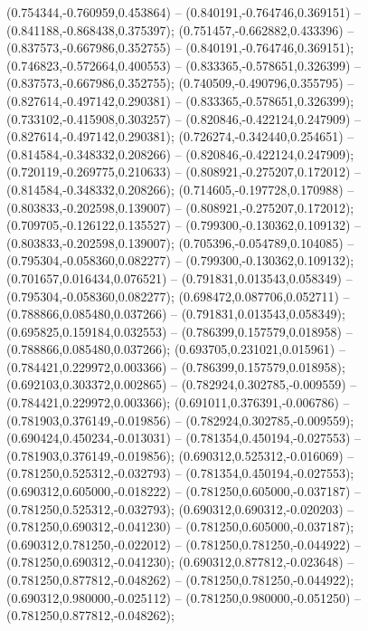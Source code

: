  (0.754344,-0.760959,0.453864) -- (0.840191,-0.764746,0.369151) -- (0.841188,-0.868438,0.375397);
 (0.751457,-0.662882,0.433396) -- (0.837573,-0.667986,0.352755) -- (0.840191,-0.764746,0.369151);
 (0.746823,-0.572664,0.400553) -- (0.833365,-0.578651,0.326399) -- (0.837573,-0.667986,0.352755);
 (0.740509,-0.490796,0.355795) -- (0.827614,-0.497142,0.290381) -- (0.833365,-0.578651,0.326399);
 (0.733102,-0.415908,0.303257) -- (0.820846,-0.422124,0.247909) -- (0.827614,-0.497142,0.290381);
 (0.726274,-0.342440,0.254651) -- (0.814584,-0.348332,0.208266) -- (0.820846,-0.422124,0.247909);
 (0.720119,-0.269775,0.210633) -- (0.808921,-0.275207,0.172012) -- (0.814584,-0.348332,0.208266);
 (0.714605,-0.197728,0.170988) -- (0.803833,-0.202598,0.139007) -- (0.808921,-0.275207,0.172012);
 (0.709705,-0.126122,0.135527) -- (0.799300,-0.130362,0.109132) -- (0.803833,-0.202598,0.139007);
 (0.705396,-0.054789,0.104085) -- (0.795304,-0.058360,0.082277) -- (0.799300,-0.130362,0.109132);
 (0.701657,0.016434,0.076521) -- (0.791831,0.013543,0.058349) -- (0.795304,-0.058360,0.082277);
 (0.698472,0.087706,0.052711) -- (0.788866,0.085480,0.037266) -- (0.791831,0.013543,0.058349);
 (0.695825,0.159184,0.032553) -- (0.786399,0.157579,0.018958) -- (0.788866,0.085480,0.037266);
 (0.693705,0.231021,0.015961) -- (0.784421,0.229972,0.003366) -- (0.786399,0.157579,0.018958);
 (0.692103,0.303372,0.002865) -- (0.782924,0.302785,-0.009559) -- (0.784421,0.229972,0.003366);
 (0.691011,0.376391,-0.006786) -- (0.781903,0.376149,-0.019856) -- (0.782924,0.302785,-0.009559);
 (0.690424,0.450234,-0.013031) -- (0.781354,0.450194,-0.027553) -- (0.781903,0.376149,-0.019856);
 (0.690312,0.525312,-0.016069) -- (0.781250,0.525312,-0.032793) -- (0.781354,0.450194,-0.027553);
 (0.690312,0.605000,-0.018222) -- (0.781250,0.605000,-0.037187) -- (0.781250,0.525312,-0.032793);
 (0.690312,0.690312,-0.020203) -- (0.781250,0.690312,-0.041230) -- (0.781250,0.605000,-0.037187);
 (0.690312,0.781250,-0.022012) -- (0.781250,0.781250,-0.044922) -- (0.781250,0.690312,-0.041230);
 (0.690312,0.877812,-0.023648) -- (0.781250,0.877812,-0.048262) -- (0.781250,0.781250,-0.044922);
 (0.690312,0.980000,-0.025112) -- (0.781250,0.980000,-0.051250) -- (0.781250,0.877812,-0.048262);
